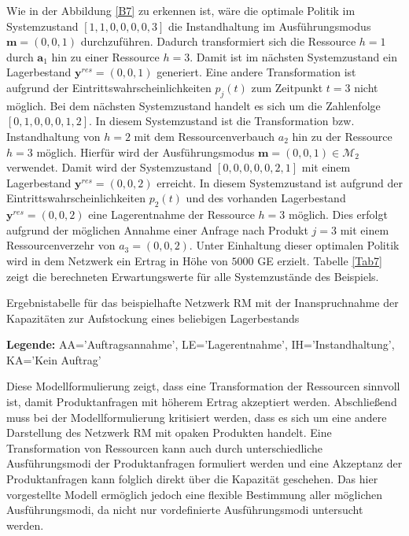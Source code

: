 Wie in der Abbildung \ref{B7} zu erkennen ist, wäre die optimale Politik im Systemzustand $[1,1,0,0,0,0,3]$ die Instandhaltung im Ausführungsmodus $\textbf{m}=(0,0,1)$ durchzuführen. Dadurch transformiert sich die Ressource $h=1$ durch $\textbf{a}_{1}$ hin zu einer Ressource $h=3$. Damit ist im nächsten Systemzustand ein Lagerbestand $\textbf{y}^{res}=(0,0,1)$ generiert. Eine andere Transformation ist aufgrund der Eintrittswahrscheinlichkeiten $p_{j}(t)$ zum Zeitpunkt $t=3$ nicht möglich. Bei dem nächsten Systemzustand handelt es sich um die Zahlenfolge $[0,1,0,0,0,1,2]$. In diesem Systemzustand ist die Transformation bzw. Instandhaltung von $h=2$ mit dem Ressourcenverbauch $a_{2}$ hin zu der Ressource $h=3$ möglich. Hierfür wird der Ausführungsmodus $\textbf{m}=(0,0,1)\in\mathcal{M}_2$ verwendet. Damit wird der Systemzustand $[0,0,0,0,0,2,1]$ mit einem Lagerbestand $\textbf{y}^{res}=(0,0,2)$ erreicht. In diesem Systemzustand ist aufgrund der Eintrittswahrscheinlichkeiten $p_2(t)$ und des vorhanden Lagerbestand $\textbf{y}^{res}=(0,0,2)$ eine Lagerentnahme der Ressource $h=3$ möglich. Dies erfolgt aufgrund der möglichen Annahme einer Anfrage nach Produkt $j=3$ mit einem Ressourcenverzehr von $a_{3}=(0,0,2)$. Unter Einhaltung dieser optimalen Politik wird in dem Netzwerk ein Ertrag in Höhe von $5000$ GE erzielt. Tabelle \ref{Tab7} zeigt die berechneten Erwartungswerte für alle Systemzustände des Beispiels. 

\begin{table}
\begin{footnotesize}
    \caption{Ergebnistabelle für das beispielhafte Netzwerk RM mit der Inanspruchnahme der Kapazitäten zur Aufstockung eines beliebigen Lagerbestands} \label{Tab7}
    \vspace*{3mm}
        \begin{center}
      \end{center}
    \begin{center}
      {\footnotesize \textbf{Legende:} AA='Auftragsannahme', LE='Lagerentnahme', IH='Instandhaltung', KA='Kein Auftrag'} 
      \end{center}
\end{footnotesize}
\end{table}

Diese Modellformulierung zeigt, dass eine Transformation der Ressourcen sinnvoll ist, damit Produktanfragen mit höherem Ertrag akzeptiert werden. Abschließend muss bei der Modellformulierung kritisiert werden, dass es sich um eine andere Darstellung des Netzwerk RM mit opaken Produkten handelt. Eine Transformation von Ressourcen kann auch durch unterschiedliche Ausführungsmodi der Produktanfragen formuliert werden und eine Akzeptanz der Produktanfragen kann folglich direkt über die Kapazität geschehen. Das hier vorgestellte Modell ermöglich jedoch eine flexible Bestimmung aller möglichen Ausführungsmodi, da nicht nur vordefinierte Ausführungsmodi untersucht werden.


